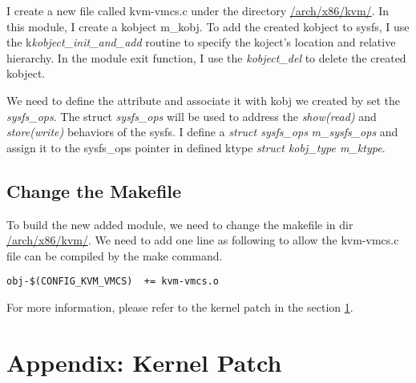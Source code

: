 \documentclass[letterpaper,10pt,onecolumn]{IEEEtran}
\begin{document}
I create a new file called kvm-vmcs.c under the directory \url{/arch/x86/kvm/}. In this module, I create a kobject m\_kobj. To add the created kobject to sysfs, I use the k\emph{kobject\_init\_and\_add} routine to specify the koject's location and relative hierarchy. In the module exit function, I use the \emph{kobject\_del } to delete the created kobject.

We need to define the attribute and associate it with kobj we created by set the \emph{sysfs\_ops}. The struct \emph{sysfs\_ops} will be used to address the \emph{show(read)} and \emph{store(write)} behaviors of the sysfs. I define a \emph{struct sysfs\_ops} \emph{m\_sysfs\_ops} and assign it to the sysfs\_ops pointer in defined ktype \emph{struct kobj\_type m\_ktype}.



\subsection{Change the Makefile}
To build the new added module, we need to change the makefile in dir \url{/arch/x86/kvm/}. We need to add one line as following to allow the kvm-vmcs.c file can be compiled by the make command.
 \begin{verbatim}
obj-$(CONFIG_KVM_VMCS)	+= kvm-vmcs.o
\end{verbatim}

For more information, please refer to the kernel patch in the section \ref{sec:patch}.

\section{Appendix: Kernel Patch}\label{sec:patch}




\end{document}

